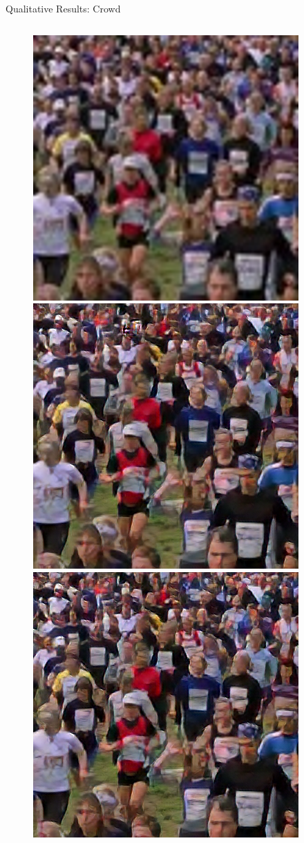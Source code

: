 \documentclass{beamer}
\begin{document}
\begin{frame}{Qualitative Results: Crowd}
\begin{figure}
  \begin{columns}
      \includegraphics[width=0.6\linewidth]{static/crowd_bilinear_interpolation.png}
      \includegraphics[width=0.6\linewidth]{static/crowd_srunet.png}
      \includegraphics[width=0.6\linewidth]{static/crowd_srunet_int8.png}
  \end{columns}

\end{figure}
\end{frame}
\end{document}

